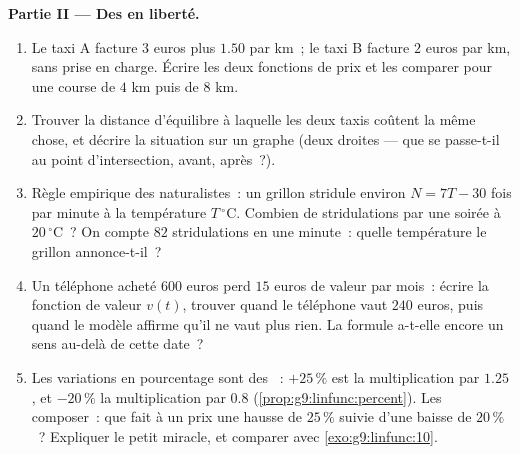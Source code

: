 \begin{problem}
\medskip
\noindent\textbf{Partie II --- Des  en liberté.}
\begin{enumerate}[resume]
  \item Le taxi A facture $3$ euros plus $1.50$ par km~; le taxi B
        facture $2$ euros par km, sans prise en charge. Écrire les
        deux fonctions de prix et les comparer pour une course de
        $4$ km puis de $8$ km.
  \item Trouver la distance d'équilibre à laquelle les deux taxis
        coûtent la même chose, et décrire la situation sur un graphe
        (deux droites --- que se passe-t-il au point
        d'intersection, avant, après~?).
  \item Règle empirique des naturalistes~: un grillon stridule
        environ $N = 7T - 30$ fois par minute à la température
        $T\,^\circ$C. Combien de stridulations par une soirée à
        $20\,^\circ$C~? On compte $82$ stridulations en une minute~:
        quelle température le grillon annonce-t-il~?
  \item Un téléphone acheté $600$ euros perd $15$ euros de valeur
        par mois~: écrire la fonction de valeur $v(t)$, trouver
        quand le téléphone vaut $240$ euros, puis quand le modèle
        affirme qu'il ne vaut plus rien. La formule a-t-elle encore
        un sens au-delà de cette date~?
  \item Les variations en pourcentage sont des ~: $+25\,\%$ est la multiplication par $1.25$, et
        $-20\,\%$ la multiplication par $0.8$
        (\cref{prop:g9:linfunc:percent}). Les composer~: que fait à
        un prix une hausse de $25\,\%$ suivie d'une baisse de
        $20\,\%$~? Expliquer le petit miracle, et comparer avec
        \cref{exo:g9:linfunc:10}.
\end{enumerate}


\end{problem}
